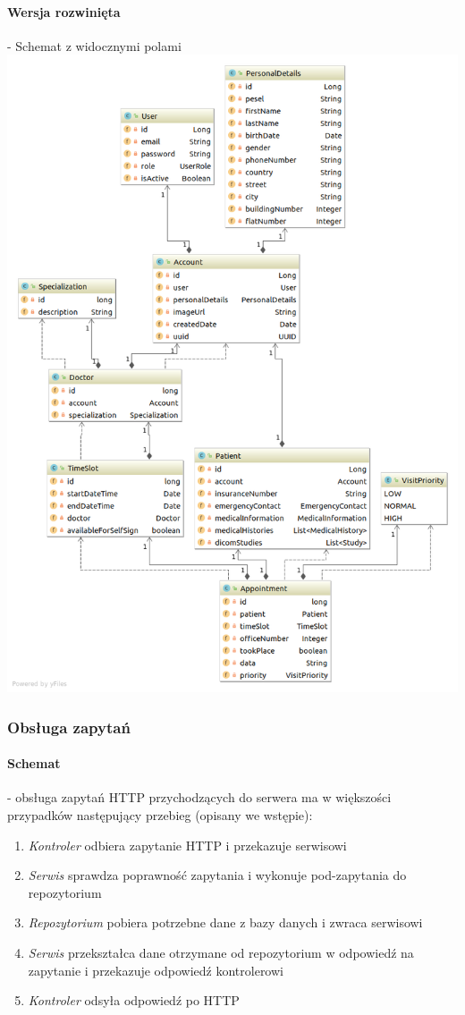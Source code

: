 \documentclass[polish,12pt]{aghthesis}
\begin{document}
\paragraph{Wersja rozwinięta} - Schemat z widocznymi polami \\
\includegraphics[width=\textwidth]{java-entities-big}

\subsubsection{Obsługa zapytań}
\paragraph{Schemat} -  
obsługa zapytań HTTP przychodzących do serwera ma w większości przypadków następujący przebieg (opisany we wstępie):
\begin{enumerate}
  \item \emph{Kontroler} odbiera zapytanie HTTP i przekazuje serwisowi
  \item \emph{Serwis} sprawdza poprawność zapytania i wykonuje pod-zapytania do repozytorium
  \item \emph{Repozytorium} pobiera potrzebne dane z bazy danych i zwraca serwisowi
  \item \emph{Serwis} przekształca dane otrzymane od repozytorium w odpowiedź na zapytanie i przekazuje odpowiedź kontrolerowi
  \item \emph{Kontroler} odsyła odpowiedź po HTTP
\end{enumerate}
\end{document}
